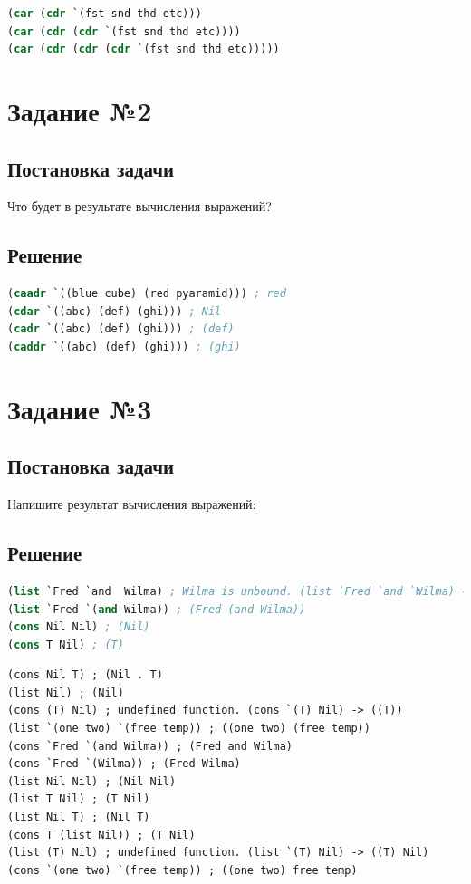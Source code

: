 \documentclass[12pt]{report}
\begin{document}
\begin{lstlisting}[label=first,caption=Решение задания №1, language=lisp]
(car (cdr `(fst snd thd etc)))
(car (cdr (cdr `(fst snd thd etc))))
(car (cdr (cdr (cdr `(fst snd thd etc)))))
\end{lstlisting}

\section*{Задание №2}
\subsection*{Постановка задачи}
Что будет в результате вычисления выражений?
\subsection*{Решение}

\begin{lstlisting}[label=second,caption=Решение задания №2, language=lisp]
(caadr `((blue cube) (red pyaramid))) ; red
(cdar `((abc) (def) (ghi))) ; Nil
(cadr `((abc) (def) (ghi))) ; (def)
(caddr `((abc) (def) (ghi))) ; (ghi)
\end{lstlisting}

\section*{Задание №3}
\subsection*{Постановка задачи}
Напишите результат вычисления выражений:
\subsection*{Решение}
\begin{lstlisting}[label=second,caption=Решение задания №3, language=lisp]
(list `Fred `and  Wilma) ; Wilma is unbound. (list `Fred `and `Wilma) -> (Fred and Wilma)
(list `Fred `(and Wilma)) ; (Fred (and Wilma))
(cons Nil Nil) ; (Nil)
(cons T Nil) ; (T)
\end{lstlisting}

\begin{lstlisting}
(cons Nil T) ; (Nil . T)
(list Nil) ; (Nil)
(cons (T) Nil) ; undefined function. (cons `(T) Nil) -> ((T))
(list `(one two) `(free temp)) ; ((one two) (free temp))
(cons `Fred `(and Wilma)) ; (Fred and Wilma)
(cons `Fred `(Wilma)) ; (Fred Wilma)
(list Nil Nil) ; (Nil Nil)
(list T Nil) ; (T Nil)
(list Nil T) ; (Nil T)
(cons T (list Nil)) ; (T Nil)
(list (T) Nil) ; undefined function. (list `(T) Nil) -> ((T) Nil)
(cons `(one two) `(free temp)) ; ((one two) free temp)
\end{lstlisting}
\end{document}
